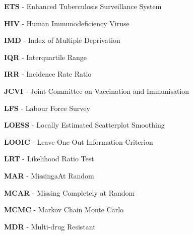 \documentclass[11pt,twoside]{bristolthesis}
\begin{document}
\begin{acronyms}
      \textbf{ETS} - Enhanced Tuberculosis Surveillance System
      
      \par
      
      \textbf{HIV} - Human Immunodeficiency Viruse
      
      \par
      
      \textbf{IMD} - Index of Multiple Deprivation
      
      \par
      
      \textbf{IQR} - Interquartile Range
      
      \par
      
      \textbf{IRR} - Incidence Rate Ratio
      
      \par
      
      \textbf{JCVI} - Joint Committee on Vaccination and Immunisation
      
      \par
      
      \textbf{LFS} - Labour Force Survey
      
      \par
      
      \textbf{LOESS} - Locally Estimated Scatterplot Smoothing
      
      \par
      
      \textbf{LOOIC} - Leave One Out Information Criterion
      
      \par
      
      \textbf{LRT} - Likelihood Ratio Test
      
      \par
      
      \textbf{MAR} - MissingaAt Random
      
      \par
      
      \textbf{MCAR} - Missing Completely at Random
      
      \par
      
      \textbf{MCMC} - Markov Chain Monte Carlo
      
      \par
      
      \textbf{MDR} - Multi-drug Resistant
      

\end{acronyms}
\end{document}

